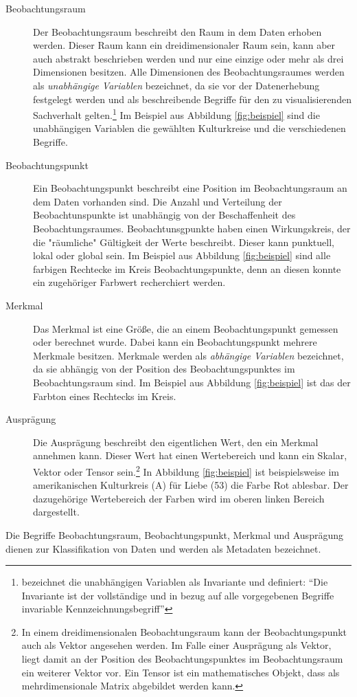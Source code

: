 \documentclass[a4paper, 12pt, DIVcalc, onepage, pdftex, headsepline, footsepline]{scrreprt}
\begin{document}
\begin{description}
\item[Beobachtungsraum]
Der Beobachtungsraum beschreibt den Raum in dem Daten erhoben werden. Dieser Raum kann ein
dreidimensionaler Raum sein, kann aber auch abstrakt beschrieben werden und nur eine einzige oder
mehr als drei Dimensionen besitzen. Alle Dimensionen des Beobachtungsraumes werden als \textit{unabhängige
Variablen} bezeichnet, da sie vor der Datenerhebung festgelegt werden und als beschreibende Begriffe für
den zu visualisierenden Sachverhalt gelten.\footnote{\citep[S.\,24]{Bertin} bezeichnet die unabhängigen
Variablen als Invariante und definiert: "`Die Invariante ist der vollständige und in bezug auf alle vorgegebenen
Begriffe invariable Kennzeichnungsbegriff"'} Im Beispiel aus Abbildung \ref{fig:beispiel} sind die
unabhängigen Variablen die gewählten Kulturkreise und die verschiedenen Begriffe.
\item[Beobachtungspunkt]
Ein Beobachtungspunkt beschreibt eine Position im Beobachtungsraum an dem Daten vorhanden sind. Die Anzahl und Verteilung
der Beobachtunspunkte ist unabhängig von der Beschaffenheit des Beobachtungsraumes. Beobachtunsgpunkte haben einen
Wirkungskreis, der die "räumliche" Gültigkeit der Werte beschreibt. Dieser kann punktuell, lokal oder global sein.
Im Beispiel aus Abbildung \ref{fig:beispiel} sind alle farbigen Rechtecke im Kreis Beobachtungspunkte, denn an
diesen konnte ein zugehöriger Farbwert recherchiert werden.
\item[Merkmal]
Das Merkmal ist eine Größe, die an einem Beobachtungspunkt gemessen oder berechnet wurde. Dabei kann
ein Beobachtungspunkt mehrere Merkmale besitzen. Merkmale werden als \textit{abhängige Variablen} bezeichnet, da
sie abhängig von der Position des Beobachtungspunktes im Beobachtungsraum sind.
Im Beispiel aus Abbildung \ref{fig:beispiel} ist das der Farbton eines Rechtecks im Kreis.
\item[Ausprägung]
Die Ausprägung beschreibt den eigentlichen Wert, den ein Merkmal annehmen kann. Dieser Wert hat einen
Wertebereich und kann ein Skalar, Vektor oder Tensor sein.\footnote{In einem dreidimensionalen Beobachtungsraum
kann der Beobachtungspunkt auch als Vektor angesehen werden. Im Falle einer Ausprägung als Vektor, liegt damit
an der Position des Beobachtungspunktes im Beobachtungsraum ein weiterer Vektor vor. Ein Tensor ist ein mathematisches
Objekt, dass als mehrdimensionale Matrix abgebildet werden kann.}
In Abbildung \ref{fig:beispiel} ist beispielsweise im amerikanischen Kulturkreis (A) für Liebe (53) die Farbe
Rot ablesbar. Der dazugehörige Wertebereich der Farben wird im oberen linken Bereich dargestellt.
\end{description}
Die Begriffe Beobachtungsraum, Beobachtungspunkt, Merkmal und Ausprägung dienen zur Klassifikation von Daten
und werden als Metadaten bezeichnet.
\end{document}
